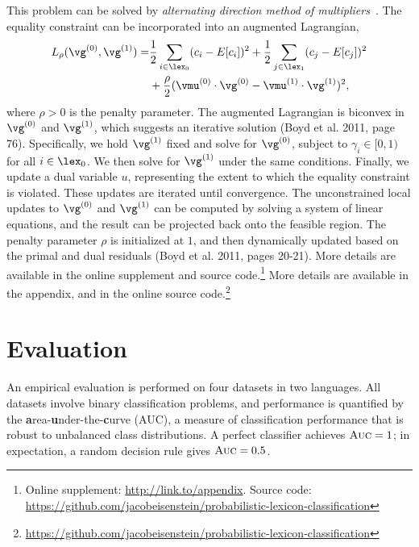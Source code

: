 This problem can be solved by \emph{alternating direction method of multipliers}~\cite{boyd2011distributed}.
The equality constraint can be incorporated into an augmented Lagrangian,
\begin{align}
\notag
L_\rho(\vg^{(0)},\vg^{(1)}) = & \frac{1}{2} \sum_{i\in \lex_0}(c_i - E[c_i])^2 + \frac{1}{2}\sum_{j \in \lex_1}(c_j - E[c_j])^2\\
& + \frac{\rho}{2}(\vmu^{(0)} \cdot \vg^{(0)} - \vmu^{(1)} \cdot \vg^{(1)})^2,
\end{align}
where $\rho > 0$ is the penalty parameter. The augmented Lagrangian is biconvex in $\vg^{(0)}$ and $\vg^{(1)}$, which suggests an iterative solution (Boyd et al. 2011, page 76)\nocite{boyd2011distributed}. Specifically, we hold $\vg^{(1)}$ fixed and solve for $\vg^{(0)}$, subject to $\gamma_i \in [0,1)$ for all $i \in \lex_0$. We then solve for $\vg^{(1)}$ under the same conditions. Finally, we update a dual variable $u$, representing the extent to which the equality constraint is violated. These updates are iterated until convergence. The unconstrained local updates to $\vg^{(0)}$ and $\vg^{(1)}$ can be computed by solving a system of linear equations, and the result can be projected back onto the feasible region. The penalty parameter $\rho$ is initialized at $1$, and then dynamically updated based on the primal and dual residuals (Boyd et al. 2011, pages 20-21)\nocite{boyd2011distributed}. 
\ifaaai
More details are available in the online supplement and source code.\footnote{Online supplement: \url{http://link.to/appendix}. Source code: \url{https://github.com/jacobeisenstein/probabilistic-lexicon-classification}}
\else
More details are available in the appendix, and in the online source code.\footnote{\url{https://github.com/jacobeisenstein/probabilistic-lexicon-classification}}
\fi

\section{Evaluation}
An empirical evaluation is performed on four datasets in two languages. All datasets involve binary classification problems, and  performance is quantified by the \textbf{a}rea-\textbf{u}nder-the-\textbf{c}urve (AUC), a measure of classification performance that is robust to unbalanced class distributions. A perfect classifier achieves $\textsc{Auc}=1$; in expectation, a random decision rule gives $\textsc{Auc}=0.5$.

